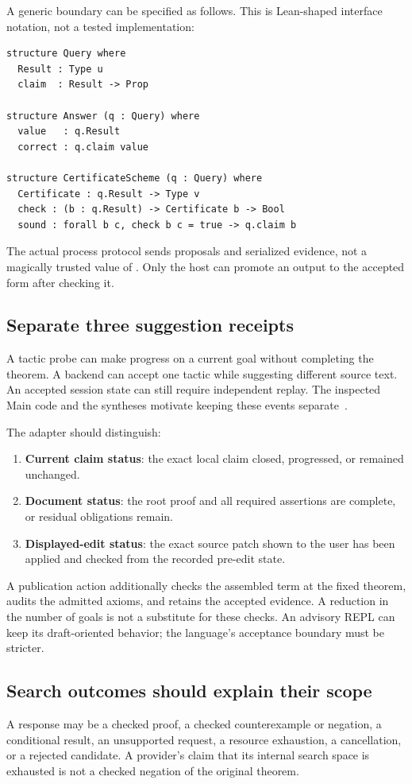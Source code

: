 \documentclass[11pt,a4paper]{article}
\newcommand{\code}[1]{\texttt{\detokenize{#1}}}
\theoremstyle{definition}
\theoremstyle{remark}
\begin{document}
A generic boundary can be specified as follows. This is Lean-shaped interface notation, not a tested implementation:
\begin{lstlisting}
structure Query where
  Result : Type u
  claim  : Result -> Prop

structure Answer (q : Query) where
  value   : q.Result
  correct : q.claim value

structure CertificateScheme (q : Query) where
  Certificate : q.Result -> Type v
  check : (b : q.Result) -> Certificate b -> Bool
  sound : forall b c, check b c = true -> q.claim b
\end{lstlisting}
The actual process protocol sends proposals and serialized evidence, not a magically trusted value of \code{Answer}. Only the host can promote an output to the accepted form after checking it.

\subsection{Separate three suggestion receipts}
A tactic probe can make progress on a current goal without completing the theorem. A backend can accept one tactic while suggesting different source text. An accepted session state can still require independent replay. The inspected Main code and the syntheses motivate keeping these events separate~\cite{main,synA}.

The adapter should distinguish:
\begin{enumerate}
\item \textbf{Current claim status}: the exact local claim closed, progressed, or remained unchanged.
\item \textbf{Document status}: the root proof and all required assertions are complete, or residual obligations remain.
\item \textbf{Displayed-edit status}: the exact source patch shown to the user has been applied and checked from the recorded pre-edit state.
\end{enumerate}
A publication action additionally checks the assembled term at the fixed theorem, audits the admitted axioms, and retains the accepted evidence. A reduction in the number of goals is not a substitute for these checks. An advisory REPL can keep its draft-oriented behavior; the language's acceptance boundary must be stricter.

\subsection{Search outcomes should explain their scope}
A response may be a checked proof, a checked counterexample or negation, a conditional result, an unsupported request, a resource exhaustion, a cancellation, or a rejected candidate. A provider's claim that its internal search space is exhausted is not a checked negation of the original theorem.
\end{document}
